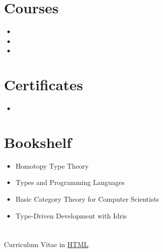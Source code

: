 \section{Courses}
\begin{itemize}
  \item {}
  \item {}
  \item {}
\end{itemize}

\section{Certificates}
\begin{itemize}
  \item {}
\end{itemize}

\section{Bookshelf}
\begin{itemize}
  \item Homotopy Type Theory
  \item Types and Programming Languages
  \item Basic Category Theory for Computer Scientists
  \item Type-Driven Development with Idris
\end{itemize}

\section*{}
Curriculum Vitae in \href{https://nobodytells.me/cv/web/cv.html}{HTML}.


